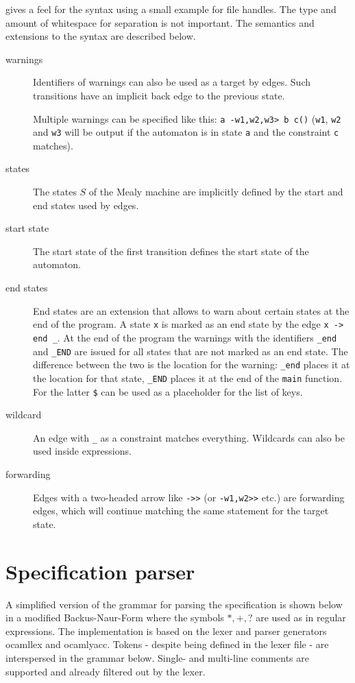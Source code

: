  gives a feel for the syntax using a small example for file handles. The type and amount of whitespace for separation is not important.
The semantics and extensions to the syntax are described below.
\begin{description}
\item[warnings]
Identifiers of warnings can also be used as a target by edges. Such transitions have an implicit back edge to the previous state.

Multiple warnings can be specified like this: \verb|a -w1,w2,w3> b c()| (\verb|w1|, \verb|w2| and \verb|w3| will be output if the automaton is in state \verb|a| and the constraint \verb|c| matches).

\item[states]
The states $S$ of the Mealy machine are implicitly defined by the start and end states used by edges.

\item[start state]
The start state of the first transition defines the start state of the automaton.

\item[end states]
End states are an extension that allows to warn about certain states at the end of the program. A state \verb|x| is marked as an end state by the edge \verb|x -> end _|.
At the end of the program the warnings with the identifiers \verb|_end| and \verb|_END| are issued for all states that are not marked as an end state. The difference between the two is the location for the warning: \verb|_end| places it at the location for that state, \verb|_END| places it at the end of the \verb|main| function. For the latter \verb|$| can be used as a placeholder for the list of keys.

\item[wildcard]
An edge with \verb|_| as a constraint matches everything. Wildcards can also be used inside expressions.

\item[forwarding]
Edges with a two-headed arrow like \verb|->>| (or \verb|-w1,w2>>| etc.) are forwarding edges, which will continue matching the same statement for the target state.
\end{description}

\section{Specification parser}
A simplified version of the grammar for parsing the specification is shown below in a modified Backus-Naur-Form where the symbols $*, +, ?$ are used as in regular expressions. The implementation is based on the lexer and parser generators ocamllex and ocamlyacc. Tokens - despite being defined in the lexer file - are interspersed in the grammar below. Single- and multi-line comments are supported and already filtered out by the lexer.

